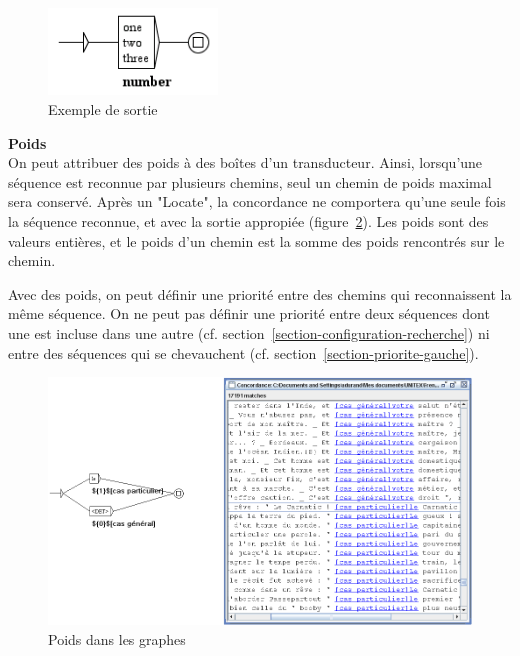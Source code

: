 \begin{figure}[h]
\begin{center}
\includegraphics[width=4.5cm]{resources/img/fig5-15.png}
\caption{Exemple de sortie\label{fig-exemple-transduction}}
\end{center}
\end{figure}


\noindent \textbf{Poids}\\


On peut attribuer des poids à des boîtes d'un transducteur. Ainsi, lorsqu'une séquence est
reconnue par plusieurs chemins, seul un chemin de poids maximal sera conservé.
Après un "Locate", la concordance ne comportera qu'une seule fois la séquence reconnue, et avec la
sortie appropiée (figure~\ref{fig-weights-in-graphs}). Les poids sont des valeurs entières,
et le poids d'un chemin est la somme des poids rencontrés sur le chemin.

\noindent Avec des poids, on peut définir une priorité entre des chemins qui reconnaissent
la même séquence. On ne peut pas définir une priorité entre deux séquences dont une est incluse
dans une autre (cf. section~\ref{section-configuration-recherche}) ni entre des séquences qui
se chevauchent  (cf. section~\ref{section-priorite-gauche}).

\bigskip
\begin{figure}[h!]
\begin{center}
\includegraphics[width=14.5cm]{resources/img/fig5-15b.png}
\caption{Poids dans les graphes \label{fig-weights-in-graphs}}
\end{center}
\end{figure}

